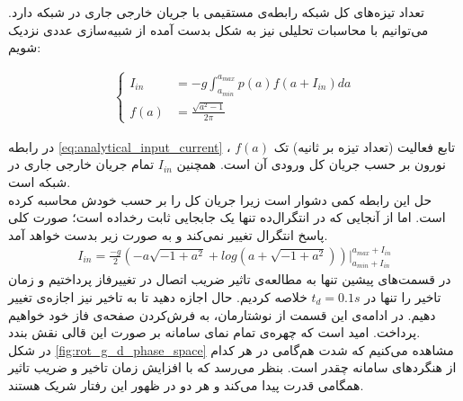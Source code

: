تعداد تیزه‌های کل شبکه رابطه‌ی مستقیمی با جریان خارجی جاری در شبکه دارد. می‌توانیم با محاسبات تحلیلی نیز به شکل بدست آمده از شبیه‌سازی عددی نزدیک شویم:

\begin{align}
	\begin{cases}
		I_{in} &= -g \int_{a_{min}}^{a_{max}} p(a) f(a + I_{in}) da \\
		f(a) &= \frac{\sqrt{a^2 - 1}}{2\pi}
	\end{cases}
	\label{eq:analytical_input_current}
\end{align}

در رابطه \ref{eq:analytical_input_current} ، $f(a)$ تابع فعالیت (تعداد تیزه بر ثانیه) تک نورون بر حسب جریان کل ورودی آن است. همچنین $I_{in}$ تمام جریان خارجی جاری در شبکه است.\\
حل این رابطه کمی دشوار است زیرا جریان کل را بر حسب خودش محاسبه کرده است. اما از آنجایی که در انتگرال‌ده تنها یک جابجایی ثابت رخداده است؛ صورت کلی پاسخ انتگرال تغییر نمی‌کند و به صورت زیر بدست خواهد آمد.
\begin{align}
	I_{in} = \frac{-g}{2} (-a \sqrt{-1 + a^2} + log(a + \sqrt{-1 + a^2})) \Big|_{a_{min} + I_{in}}^{a_{max} + I_{in}}
\end{align}
در قسمت‌های پیشین تنها به مطالعه‌ی تاثیر ضریب اتصال در تغییرفاز پرداختیم و زمان تاخیر را تنها در $t_d = 0.1 s$ خلاصه کردیم. حال اجازه دهید تا به تاخیر نیز اجازه‌ی تغییر دهیم. در ادامه‌ی این قسمت از نوشتارمان، به فرش‌کردن صفحه‌ی فاز خود خواهیم پرداخت. امید است که چهره‌ی تمام نمای سامانه‌ بر صورت این قالی نقش بندد.\\


در شکل \ref{fig:rot_g_d_phase_space} مشاهده می‌کنیم که شدت هم‌گامی در هر کدام از هنگردهای سامانه چقدر است. بنظر می‌رسد که با افزایش زمان تاخیر و ضریب تاثیر همگامی قدرت پیدا می‌کند و هر دو در ظهور این رفتار شریک هستند.
